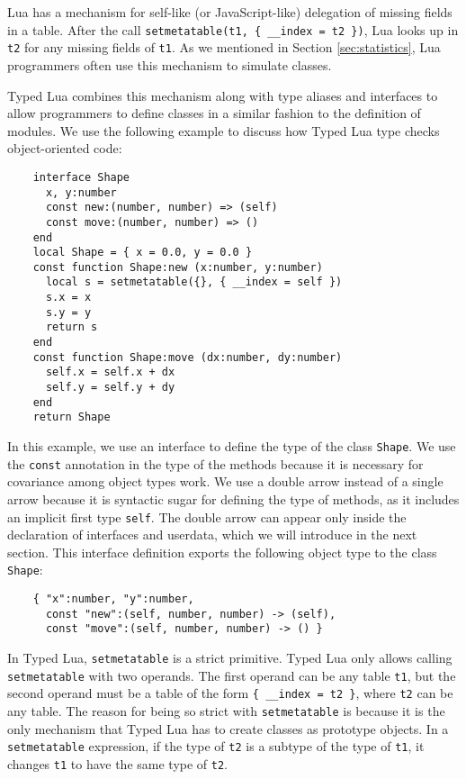 Lua has a mechanism for self-like (or JavaScript-like) delegation of
missing fields in a table.
After the call \texttt{setmetatable(t1, \{ \string_\string_index = t2 \})},
Lua looks up in \texttt{t2} for any missing fields of \texttt{t1}.
As we mentioned in Section \ref{sec:statistics},
Lua programmers often use this mechanism to simulate classes.

Typed Lua combines this mechanism along with type aliases and
interfaces to allow programmers to define classes in a similar
fashion to the definition of modules.
We use the following example to discuss how Typed Lua type checks
object-oriented code:
\begin{verbatim}
    interface Shape
      x, y:number
      const new:(number, number) => (self)
      const move:(number, number) => ()
    end
    local Shape = { x = 0.0, y = 0.0 }
    const function Shape:new (x:number, y:number)
      local s = setmetatable({}, { __index = self })
      s.x = x
      s.y = y
      return s
    end
    const function Shape:move (dx:number, dy:number)
      self.x = self.x + dx
      self.y = self.y + dy
    end
    return Shape
\end{verbatim}

In this example, we use an interface to define the type of the class \texttt{Shape}.
We use the \texttt{const} annotation in the type of the methods
because it is necessary for covariance among object types work.
We use a double arrow instead of a single arrow because it is
syntactic sugar for defining the type of methods,
as it includes an implicit first type \texttt{self}.
The double arrow can appear only inside the declaration of
interfaces and userdata, which we will introduce in the next section.
This interface definition exports the following object type to the class \texttt{Shape}:
\begin{verbatim}
    { "x":number, "y":number,
      const "new":(self, number, number) -> (self),
      const "move":(self, number, number) -> () }
\end{verbatim}

In Typed Lua, \texttt{setmetatable} is a strict primitive.
Typed Lua only allows calling \texttt{setmetatable} with
two operands.
The first operand can be any table \texttt{t1}, but
the second operand must be a table of the form
\texttt{\{ \string_\string_index = t2 \}},
where \texttt{t2} can be any table.
The reason for being so strict with \texttt{setmetatable} is because
it is the only mechanism that Typed Lua has to create classes
as prototype objects.
In a \texttt{setmetatable} expression, if the type of \texttt{t2}
is a subtype of the type of \texttt{t1}, it changes \texttt{t1} to
have the same type of \texttt{t2}.

